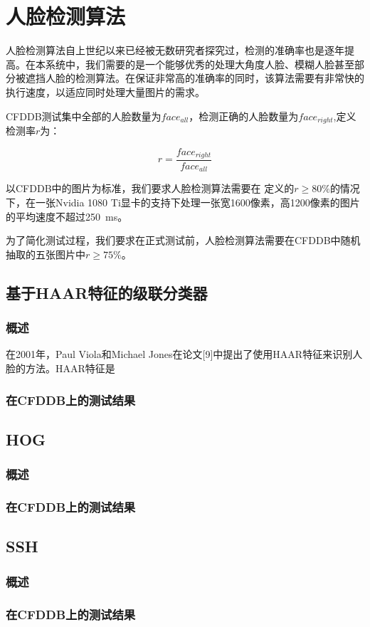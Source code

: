 \chapter{人脸检测算法}
\label{chap:facedetection}

人脸检测算法自上世纪以来已经被无数研究者探究过，检测的准确率也是逐年提高。在本系统中，我们需要的是一个能够优秀的处理大角度人脸、模糊人脸甚至部分被遮挡人脸的检测算法。在保证非常高的准确率的同时，该算法需要有非常快的执行速度，以适应同时处理大量图片的需求。

CFDDB测试集中全部的人脸数量为$face_{all}$，检测正确的人脸数量为$face_{right}$,定义检测率$r$为：

\begin{displaymath}
\label{eq:rdef}
	r = \frac{face_{right}}{face_{all}} 
\end{displaymath}

以CFDDB中的图片为标准，我们要求人脸检测算法需要在 定义的$r\geq 80\%$的情况下，在一张Nvidia 1080 Ti显卡的支持下处理一张宽1600像素，高1200像素的图片的平均速度不超过\SI{250}{ms}。

为了简化测试过程，我们要求在正式测试前，人脸检测算法需要在CFDDB中随机抽取的五张图片中$r\geq 75\%$。


\section{基于HAAR特征的级联分类器}

\subsection{概述}
在2001年，Paul Viola和Michael Jones在论文[9]中提出了使用HAAR特征来识别人脸的方法。HAAR特征是



\subsection{在CFDDB上的测试结果}


\section{HOG}

\subsection{概述}

\subsection{在CFDDB上的测试结果}


\section{SSH}

\subsection{概述}

\subsection{在CFDDB上的测试结果}

